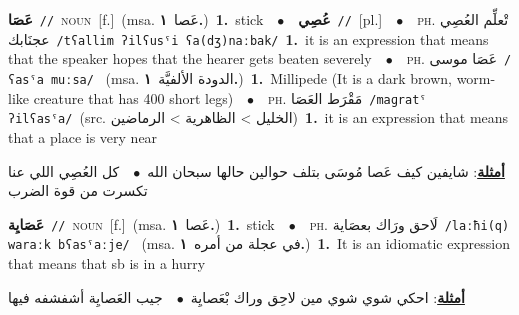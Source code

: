 \documentclass[10pt,a4paper,twoside]{article} %
\begin{document}
\begin{multicols}{2}
{\setlength\topsep{0pt}\textbf{\foreignlanguage{arabic}{عَصَا}}\ {\color{gray}\texttt{//}\color{black}}\ \textsc{noun}\ [f.]\ \color{gray}(msa. \foreignlanguage{arabic}{عَصا}~\foreignlanguage{arabic}{\textbf{١.}})\color{black}\ \textbf{1.}~stick\ \ $\bullet$\ \ \setlength\topsep{0pt}\textbf{\foreignlanguage{arabic}{عُصِي}}\ {\color{gray}\texttt{//}\color{black}}\ [pl.]\ \ $\bullet$\ \ \textsc{ph.} \color{gray} \foreignlanguage{arabic}{تْعلِّم العُصِي عجنَابك}\color{black}\ {\color{gray}\texttt{/{\sffamily tʕallim ʔilʕusˤi ʕa(dʒ)naːbak}/}\color{black}}\ \textbf{1.}~it is an expression that means that the speaker hopes that the hearer gets beaten severely\ \ $\bullet$\ \ \textsc{ph.} \color{gray} \foreignlanguage{arabic}{عَصَا موسى}\color{black}\ {\color{gray}\texttt{/{\sffamily ʕasˤa muːsa}/}\color{black}}\ \color{gray} (msa. \foreignlanguage{arabic}{الدودة الألفيَّة}~\foreignlanguage{arabic}{\textbf{١.}})\color{black}\ \textbf{1.}~Millipede (It is a dark brown, worm-like creature that has 400 short legs)\ \ $\bullet$\ \ \textsc{ph.} \color{gray} \foreignlanguage{arabic}{مَقْرَط العَصَا}\color{black}\ {\color{gray}\texttt{/{\sffamily maɡratˤ ʔilʕasˤa}/}\color{black}}\ \color{gray}(src. \foreignlanguage{arabic}{الخليل > الظاهرية > الرماضين})\color{black}\ \textbf{1.}~it is an expression that means that a place is very near\  \begin{flushright}\color{gray}\foreignlanguage{arabic}{\textbf{\underline{\foreignlanguage{arabic}{أمثلة}}}: شايفين كيف عَصا مُوسَى بتلف حوالين حالها سبحان الله\ $\bullet$\ \  كل العُصِي اللي عنا تكسرت من قوة الضرب}\end{flushright}\color{black}} \vspace{2mm}

{\setlength\topsep{0pt}\textbf{\foreignlanguage{arabic}{عَصَايِة}}\ {\color{gray}\texttt{//}\color{black}}\ \textsc{noun}\ [f.]\ \color{gray}(msa. \foreignlanguage{arabic}{عَصا}~\foreignlanguage{arabic}{\textbf{١.}})\color{black}\ \textbf{1.}~stick\ \ $\bullet$\ \ \textsc{ph.} \color{gray} \foreignlanguage{arabic}{لَاحق ورَاك بعصَاية}\color{black}\ {\color{gray}\texttt{/{\sffamily laːħi(q) waraːk bʕasˤaːje}/}\color{black}}\ \color{gray} (msa. \foreignlanguage{arabic}{في عجلة من أمره}~\foreignlanguage{arabic}{\textbf{١.}})\color{black}\ \textbf{1.}~It is an idiomatic expression that means that sb is in a hurry\  \begin{flushright}\color{gray}\foreignlanguage{arabic}{\textbf{\underline{\foreignlanguage{arabic}{أمثلة}}}: احكي شوي شوي مين لاحِق وراك بْعَصايِة\ $\bullet$\ \  جيب العَصايِة أشفشفه فيها}\end{flushright}\color{black}} \vspace{2mm}


\end{multicols}
\end{document}
